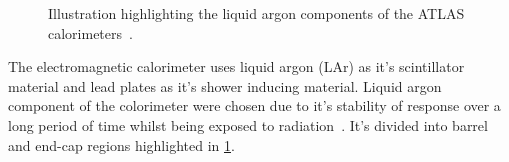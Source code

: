\begin{figure}
    \centering
    \caption[Illustration highlighting the liquid argon components of the ATLAS calorimeters]{Illustration highlighting the liquid argon components of the ATLAS calorimeters~\cite{ATLASLarImage}.}
    \label{fig:method:ATLAS:LAr}
\end{figure}

The electromagnetic calorimeter uses liquid argon (LAr) as it's scintillator material and lead plates as it's shower inducing material. Liquid argon component of the colorimeter were chosen due to it's stability of response over a long period of time whilst being exposed to radiation~\cite{ATLAS:LAr-TDR}. It's divided into barrel and end-cap regions highlighted in \cref{fig:method:ATLAS:LAr}. 

